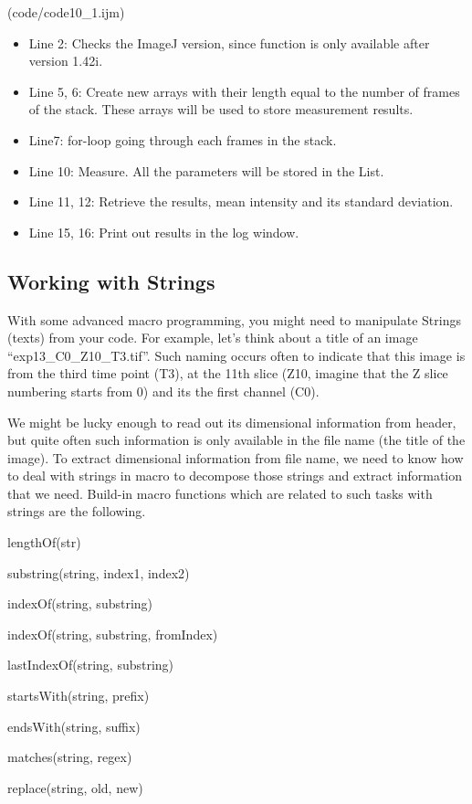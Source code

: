 (code/code10_1.ijm)

\begin{itemize}
  \item Line 2: Checks the ImageJ version, since  function is only available after version 1.42i.
  \item Line 5, 6: Create new arrays with their length equal to the number of frames of the stack. These arrays will be used to store measurement results. 
  \item Line7: for-loop going through each frames in the stack.
  \item Line 10: Measure. All the parameters will be stored in the List. 
  \item Line 11, 12: Retrieve the results, mean intensity and its standard deviation. 
  \item Line 15, 16: Print out results in the log window. 
\end{itemize}

\subsection{Working with Strings}

With some advanced macro programming, you might need to manipulate Strings (texts) from your code. For example, let's think about a title of an image ``exp13\_C0\_Z10\_T3.tif''. Such naming occurs often to indicate that this image is from the third time point (T3), at the 11th slice (Z10, imagine that the Z slice numbering starts from 0) and its the first channel (C0).

We might be lucky enough to read out its dimensional information from header, but quite often such information is only available in the file name (the title of the image). To extract dimensional information from file name, we need to know how to deal with strings in macro to decompose those strings and extract information that we need. Build-in macro functions which are related to such tasks with strings are the following.

\begin{shaded}
\begin{indentCom}
\item lengthOf(str)
\item substring(string, index1, index2)
\item indexOf(string, substring)
\item indexOf(string, substring, fromIndex)
\item lastIndexOf(string, substring)
\item startsWith(string, prefix)
\item endsWith(string, suffix)
\item matches(string, regex)
\item replace(string, old, new)
\end{indentCom}\end{shaded}

